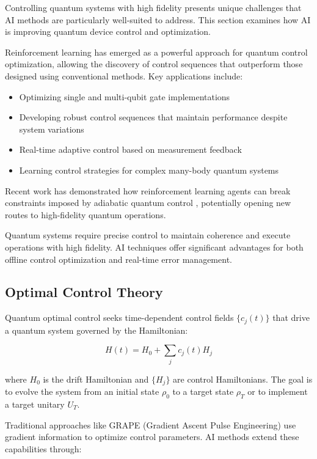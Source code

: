 Controlling quantum systems with high fidelity presents unique challenges that AI methods are particularly well-suited to address. This section examines how AI is improving quantum device control and optimization.

Reinforcement learning has emerged as a powerful approach for quantum control optimization, allowing the discovery of control sequences that outperform those designed using conventional methods. Key applications include:

\begin{itemize}
    \item Optimizing single and multi-qubit gate implementations
    \item Developing robust control sequences that maintain performance despite system variations
    \item Real-time adaptive control based on measurement feedback
    \item Learning control strategies for complex many-body quantum systems
\end{itemize}

Recent work has demonstrated how reinforcement learning agents can break constraints imposed by adiabatic quantum control \cite{ding2021breaking}, potentially opening new routes to high-fidelity quantum operations. 

Quantum systems require precise control to maintain coherence and execute operations with high fidelity. AI techniques offer significant advantages for both offline control optimization and real-time error management.

\subsection{Optimal Control Theory}
Quantum optimal control seeks time-dependent control fields $\{c_j(t)\}$ that drive a quantum system governed by the Hamiltonian:

\begin{equation}
H(t) = H_0 + \sum_j c_j(t) H_j
\end{equation}

where $H_0$ is the drift Hamiltonian and $\{H_j\}$ are control Hamiltonians. The goal is to evolve the system from an initial state $\rho_0$ to a target state $\rho_T$ or to implement a target unitary $U_T$.

Traditional approaches like GRAPE (Gradient Ascent Pulse Engineering) use gradient information to optimize control parameters. AI methods extend these capabilities through:

